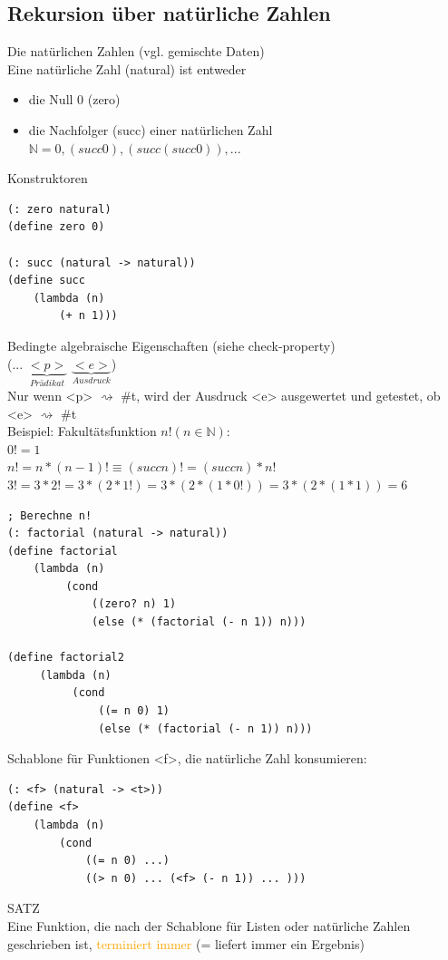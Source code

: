 \documentclass[paper=a4, fontsize=11pt]{scrartcl}
\numberwithin{equation}{section}
\numberwithin{figure}{section}
\numberwithin{table}{section}
\begin{document}
\begin{lstlistig}
\subsection{Rekursion über natürliche Zahlen}
Die natürlichen Zahlen (vgl. gemischte Daten) \\
Eine natürliche Zahl (natural) ist entweder \\
\begin{itemize}
\item die Null 0 (zero)
\item die Nachfolger (succ) einer natürlichen Zahl $\mathbb{N}= {0, (succ 0), (succ (succ 0)), ...}$
\end{itemize}
Konstruktoren \\
\begin{lstlisting}
(: zero natural)
(define zero 0)

(: succ (natural -> natural))
(define succ
    (lambda (n)
        (+ n 1)))
\end{lstlisting}

Bedingte algebraische Eigenschaften (siehe check-property) \\
(... $\underbrace{<p>}_{Prädikat}$ $ \underbrace{<e>}_{Ausdruck}$) \\
Nur wenn <p> $\rightsquigarrow$ \#t, wird der Ausdruck <e> ausgewertet und getestet, ob <e> $\rightsquigarrow$ \#t \\
Beispiel: Fakultätsfunktion $n! (n \in \mathbb{N})$: \\
$0! = 1$ \\
$n! = n * (n-1)! \equiv (succ n)! = (succ n) * n!$ \\

$3! = 3*2! = 3* (2 * 1!) = 3*(2*(1*0!)) = 3*(2*(1*1)) =6$ \\

\begin{lstlisting}
; Berechne n!
(: factorial (natural -> natural))
(define factorial
    (lambda (n)
         (cond
             ((zero? n) 1)
             (else (* (factorial (- n 1)) n)))
             
(define factorial2
     (lambda (n)
          (cond
              ((= n 0) 1)
              (else (* (factorial (- n 1)) n)))             
\end{lstlisting}

Schablone für Funktionen <f>, die natürliche Zahl konsumieren:
\begin{lstlisting}
(: <f> (natural -> <t>))
(define <f>
    (lambda (n)
        (cond
            ((= n 0) ...)
            ((> n 0) ... (<f> (- n 1)) ... )))
\end{lstlisting}
SATZ \\
Eine Funktion, die nach der Schablone für Listen oder natürliche Zahlen geschrieben ist, \textcolor{orange}{terminiert immer} (= liefert immer ein Ergebnis) \\


\end{lstlistig}
\end{document}
